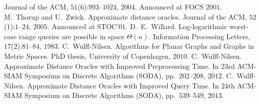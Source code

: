 \documentclass[11pt]{article}
\begin{document}
\begin{thebibliography}{99}
  Journal of the ACM, $51$($6$):$993$--$1024$, $2004$. Announced at FOCS $2001$.
  M.~Thorup and U.~Zwick.
  Approximate distance oracles.
  Journal of the ACM, $52$($1$):$1$--$24$, $2005$. Announced at STOC'$01$.
  D.~E.~Willard.
  Log-logarithmic worst-case range queries are possible in space $\Theta(n)$.
  Information Processing Letters, $17$($2$):$81$--$84$, $1983$.
  C.~Wulff-Nilsen.
  Algorithms for Planar Graphs and Graphs in Metric Spaces.
  PhD thesis, University of Copenhagen, $2010$.
  C.~Wulff-Nilsen.
  Approximate Distance Oracles with Improved Preprocessing Time.
  In $23$rd ACM-SIAM Symposium on Discrete Algorithms (SODA), pp.~$202$--$208$, $2012$.
  C.~Wulff-Nilsen.
  Approximate Distance Oracles with Improved Query Time.
  In $24$th ACM-SIAM Symposium on Discrete Algorithms (SODA), pp.~$539$--$549$, $2013$.
\end{thebibliography}
\end{document}
